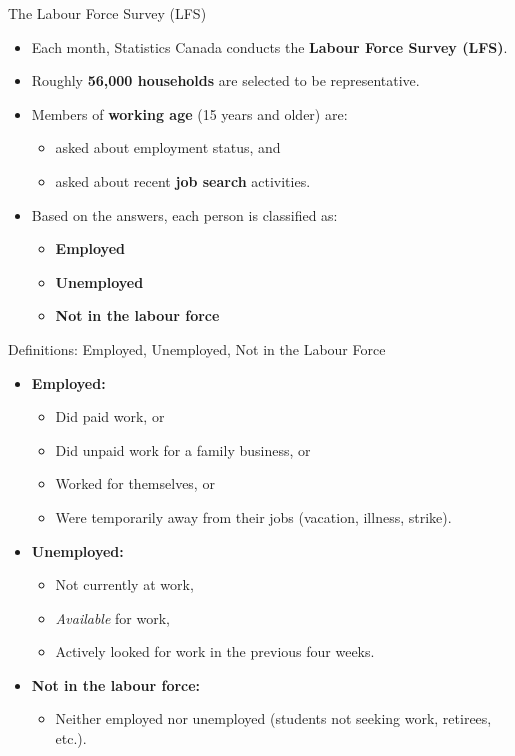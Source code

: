 \documentclass[aspectratio=169]{beamer}
\begin{document}
\begin{frame}{The Labour Force Survey (LFS)}
\transfade
\begin{itemize}
  \item Each month, Statistics Canada conducts the \textbf{Labour Force Survey (LFS)}.
  \item Roughly \textbf{56,000 households} are selected to be representative.
  \item Members of \textbf{working age} (15 years and older) are:
  \begin{itemize}
    \item asked about employment status, and
    \item asked about recent \textbf{job search} activities.
  \end{itemize}
  \item Based on the answers, each person is classified as:
  \begin{itemize}
    \item \textbf{Employed}
    \item \textbf{Unemployed}
    \item \textbf{Not in the labour force}
  \end{itemize}
\end{itemize}
\end{frame}

\begin{frame}{Definitions: Employed, Unemployed, Not in the Labour Force}
\transfade
\begin{itemize}
  \item \textbf{Employed:}
  \begin{itemize}
    \item Did paid work, or
    \item Did unpaid work for a family business, or
    \item Worked for themselves, or
    \item Were temporarily away from their jobs (vacation, illness, strike).
  \end{itemize}
  \item \textbf{Unemployed:}
  \begin{itemize}
    \item Not currently at work,
    \item \emph{Available} for work,
    \item Actively looked for work in the previous four weeks.
  \end{itemize}
  \item \textbf{Not in the labour force:}
  \begin{itemize}
    \item Neither employed nor unemployed (students not seeking work, retirees, etc.).
  \end{itemize}
\end{itemize}
\end{frame}
\end{document}
